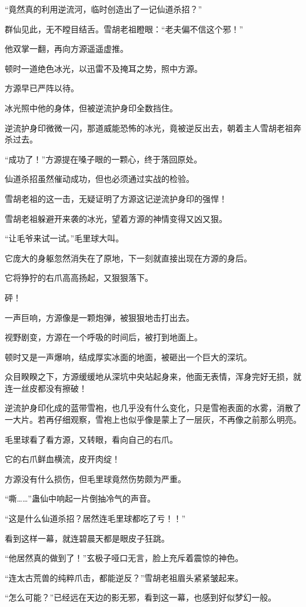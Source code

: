 \begin{this_body}
“竟然真的利用逆流河，临时创造出了一记仙道杀招？”

群仙见此，无不瞠目结舌。雪胡老祖瞪眼：“老夫偏不信这个邪！”

他双掌一翻，再向方源遥遥虚推。

顿时一道绝色冰光，以迅雷不及掩耳之势，照中方源。

方源早已严阵以待。

冰光照中他的身体，但被逆流护身印全数挡住。

逆流护身印微微一闪，那道威能恐怖的冰光，竟被逆反出去，朝着主人雪胡老祖奔杀过去。

“成功了！”方源提在嗓子眼的一颗心，终于落回原处。

仙道杀招虽然催动成功，但也必须通过实战的检验。

雪胡老祖的这一击，无疑证明了方源这记逆流护身印的强悍！

雪胡老祖躲避开来袭的冰光，望着方源的神情变得又凶又狠。

“让毛爷来试一试。”毛里球大叫。

它庞大的身躯忽然消失在了原地，下一刻就直接出现在方源的身后。

它将狰狞的右爪高高扬起，又狠狠落下。

砰！

一声巨响，方源像是一颗炮弹，被狠狠地击打出去。

视野剧变，方源在一个呼吸的时间后，被打到地面上。

顿时又是一声爆响，结成厚实冰面的地面，被砸出一个巨大的深坑。

众目睽睽之下，方源缓缓地从深坑中央站起身来，他面无表情，浑身完好无损，就连一丝皮都没有擦破！

逆流护身印化成的蓝带雪袍，也几乎没有什么变化，只是雪袍表面的水雾，消散了一大片。若再仔细观察，雪袍上也似乎像是蒙上了一层灰，不再像之前那么明亮。

毛里球看了看方源，又转眼，看向自己的右爪。

它的右爪鲜血横流，皮开肉绽！

方源没有什么损伤，但毛里球竟然伤势颇为严重。

“嘶……”蛊仙中响起一片倒抽冷气的声音。

“这是什么仙道杀招？居然连毛里球都吃了亏！！”

看到这样一幕，就连碧晨天都是眼皮子狂跳。

“他居然真的做到了！”玄极子哑口无言，脸上充斥着震惊的神色。

“连太古荒兽的纯粹爪击，都能逆反？”雪胡老祖眉头紧紧皱起来。

“怎么可能？”已经远在天边的影无邪，看到这一幕，也感到好似梦幻一般。


\end{this_body}
